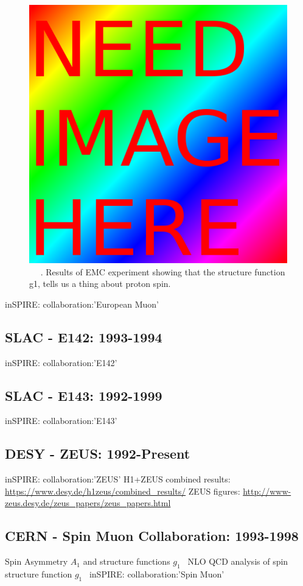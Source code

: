 \begin{figure}[ht]
	\begin{center}
	\includegraphics[width=0.5\linewidth]{../filler/squareimg.png}
	\caption{~\needfig{} ~\needcap{}. Results of EMC experiment showing that the structure
	function g1, tells us a thing about proton spin.}
	\label{fig:emc_g1_result}
\end{center}
\end{figure}

inSPIRE: collaboration:'European Muon'

\subsection{SLAC - E142: 1993-1994}
inSPIRE: collaboration:'E142'

\subsection{SLAC - E143: 1992-1999} 
inSPIRE: collaboration:'E143'

\subsection{DESY - ZEUS: 1992-Present}
inSPIRE: collaboration:'ZEUS'
H1+ZEUS combined results: \url{https://www.desy.de/h1zeus/combined_results/}
ZEUS figures: \url{http://www-zeus.desy.de/zeus_papers/zeus_papers.html}

\subsection{CERN - Spin Muon Collaboration: 1993-1998}
Spin Asymmetry $A_1$ and structure functions $g_1$~\cite{Adeva1998}
NLO QCD analysis of spin structure function $g_1$~\cite{Adeva1998a}
inSPIRE: collaboration:'Spin Muon'

